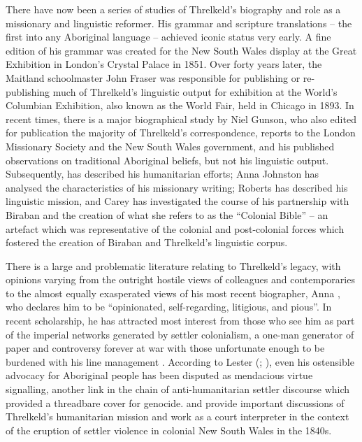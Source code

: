There have now been a series of studies of Threlkeld’s biography and role as a missionary and linguistic reformer. His grammar and scripture translations -- the first into any Aboriginal language -- achieved iconic status very early. A fine edition of his grammar was created for the New South Wales display at the Great Exhibition in London’s Crystal Palace in 1851. Over forty years later, the Maitland schoolmaster John Fraser was responsible for publishing or re-publishing much of Threlkeld’s linguistic output for exhibition at the World’s Columbian Exhibition, also known as the World Fair, held in Chicago in 1893. In recent times, there is a major biographical study by Niel Gunson, who also edited for publication the majority of Threlkeld’s correspondence, reports to the London Missionary Society and the New South Wales government, and his published observations on traditional Aboriginal beliefs, but not his linguistic output. Subsequently, \citet[11--13]{reynolds_whispering_1998} has described his humanitarian efforts; Anna Johnston has analysed the characteristics of his missionary writing; Roberts has described his linguistic mission, and Carey has investigated the course of his partnership with Biraban and the creation of what she refers to as the “Colonial Bible” -- an artefact which was representative of the colonial and post-colonial forces which fostered the creation of Biraban and Threlkeld’s linguistic corpus.

There is a large and problematic literature relating to Threlkeld’s legacy, with opinions varying from the outright hostile views of colleagues and contemporaries to the almost equally exasperated views of his most recent biographer, Anna \citet[2]{johnston_paper_2011}, who declares him to be “opinionated, self-regarding, litigious, and pious”. In recent scholarship, he has attracted most interest from those who see him as part of the imperial networks generated by settler colonialism, a one-man generator of paper and controversy forever at war with those unfortunate enough to be burdened with his line management \citep{lambert_colonial_2006}. According to Lester (\cite{lester_colonization_2014}; \cite{lester_british_2002,lester_colonial_2002,lester_obtaining_2002}), even his ostensible advocacy for Aboriginal people has been disputed as mendacious virtue signalling, another link in the chain of anti-humanitarian settler discourse which provided a threadbare cover for genocide. \citet{mitchell_good_2011} and \citet{curthoys_taking_2018} provide important discussions of Threlkeld’s humanitarian mission and work as a court interpreter in the context of the eruption of settler violence in colonial New South Wales in the 1840s.

